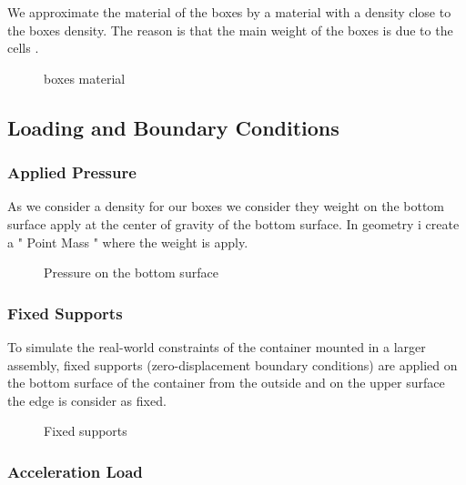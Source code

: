 \documentclass[11pt,a4paper]{article}
\begin{document}
		We approximate the material of the boxes by a material with a density close to the boxes density. The reason is that the main weight of the boxes is due to the cells .
		
		\begin{figure}[H]
			\centering
			\caption{boxes material  }
			\label{fig: Material}
		\end{figure}
	
	
	
	
	
	
	\subsection{Loading and Boundary Conditions}
	
		\subsubsection{Applied Pressure}
		
		As we consider a density for our boxes we consider they weight on the bottom surface apply at the center of gravity of the bottom surface. In geometry i create a " Point Mass " where the weight is apply.
		
		\begin{figure}[H]
			\centering
			\caption{Pressure on the bottom surface}
			\label{fig: Pressure force}
		\end{figure}
		
		\subsubsection{Fixed Supports}
		
		To simulate the real-world constraints of the container mounted in a larger assembly, fixed supports (zero-displacement boundary conditions) are applied on the bottom surface of the container from the outside and on the upper surface the edge is consider as fixed.
		
		\begin{figure}[H]
			\centering
			\caption{ Fixed supports }
			\label{fig; Fixed supprot}
		\end{figure}
		
	
	
	\subsubsection{Acceleration Load}
	
\end{document}
